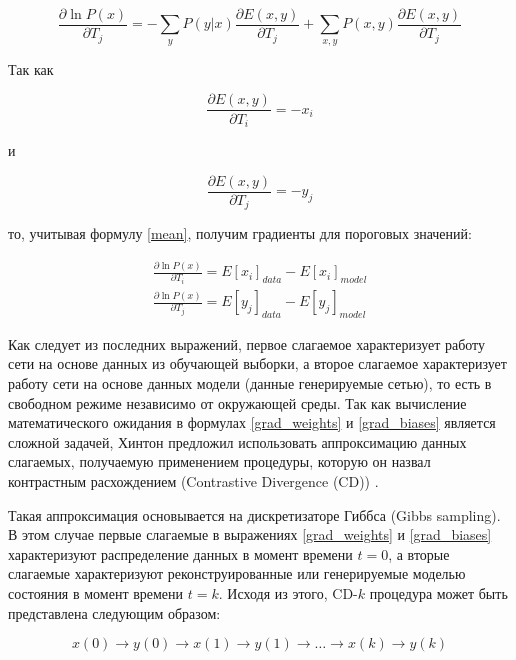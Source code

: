 \begin{equation*}
	\frac{\partial \ln P(x)}{\partial T_{j}}=-\sum_y P(y \lvert x)\frac{\partial E(x,y)}{\partial T_{j}} + \sum_{x,y} P(x,y)\frac{\partial E(x,y)}{\partial T_{j}}
\end{equation*}

Так как

\begin{equation*}
	\frac{\partial E(x,y)}{\partial T_{i}}=-x_i 
\end{equation*}

и 

\begin{equation*}
	\frac{\partial E(x,y)}{\partial T_{j}}=-y_j 
\end{equation*}

то, учитывая формулу \ref{mean}, получим градиенты для пороговых значений:

\begin{equation}
	\label{grad_biases}
	\begin{aligned}
		\frac{\partial \ln P(x)}{\partial T_i}=E\left[x_i\right]_{data}-E\left[x_i\right]_{model}\\
		\frac{\partial \ln P(x)}{\partial T_j}=E\left[y_j\right]_{data}-E\left[y_j\right]_{model}
	\end{aligned}
\end{equation}

Как следует из последних выражений, первое слагаемое характеризует работу сети на основе данных из обучающей выборки, а  второе слагаемое характеризует работу сети на основе данных модели (данные генерируемые сетью), то есть в свободном режиме независимо от окружающей среды.
Так как вычисление математического ожидания в формулах \ref{grad_weights} и \ref{grad_biases} является сложной задачей, Хинтон предложил использовать аппроксимацию данных слагаемых, получаемую применением процедуры, которую он назвал контрастным расхождением (Contrastive Divergence (CD)) \cite{n1}.

Такая аппроксимация основывается на дискретизаторе Гиббса (Gibbs sampling). В этом случае первые слагаемые в выражениях \ref{grad_weights} и \ref{grad_biases} характеризуют распределение данных в момент времени $t=0$, а вторые слагаемые характеризуют реконструированные или генерируемые моделью состояния в момент времени $t=k$. Исходя из этого, CD-$k$ процедура может быть представлена следующим образом:

\begin{equation}
	x(0) \rightarrow y(0) \rightarrow x(1) \rightarrow y(1) \rightarrow \ldots \rightarrow x(k) \rightarrow y(k)
\end{equation}

